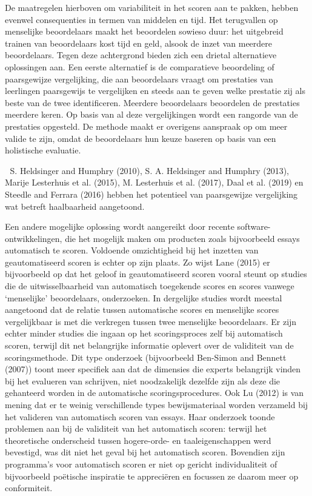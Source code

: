 \documentclass[
  letterpaper,
]{report}
\begin{document}
De maatregelen hierboven om variabiliteit in het scoren aan te pakken,
hebben evenwel consequenties in termen van middelen en tijd. Het
terugvallen op menselijke beoordelaars maakt het beoordelen sowieso
duur: het uitgebreid trainen van beoordelaars kost tijd en geld, alsook
de inzet van meerdere beoordelaars. Tegen deze achtergrond bieden zich
een drietal alternatieve oplossingen aan. Een eerste alternatief is de
comparatieve beoordeling of paarsgewijze vergelijking, die aan
beoordelaars vraagt om prestaties van leerlingen paarsgewijs te
vergelijken en steeds aan te geven welke prestatie zij als beste van de
twee identificeren. Meerdere beoordelaars beoordelen de prestaties
meerdere keren. Op basis van al deze vergelijkingen wordt een rangorde
van de prestaties opgesteld. De methode maakt er overigens aanspraak op
om meer valide te zijn, omdat de beoordelaars hun keuze baseren op basis
van een holistische evaluatie.

📖 S. Heldsinger and Humphry (2010), S. A. Heldsinger and Humphry
(2013), Marije Lesterhuis et al. (2015), M. Lesterhuis et al. (2017),
Daal et al. (2019) en Steedle and Ferrara (2016) hebben het potentieel
van paarsgewijze vergelijking wat betreft haalbaarheid aangetoond.

Een andere mogelijke oplossing wordt aangereikt door recente
software-ontwikkelingen, die het mogelijk maken om producten zoals
bijvoorbeeld essays automatisch te scoren. Voldoende omzichtigheid bij
het inzetten van geautomatiseerd scoren is echter op zijn plaats. Zo
wijst Lane (2015) er bijvoorbeeld op dat het geloof in geautomatiseerd
scoren vooral steunt op studies die de uitwisselbaarheid van automatisch
toegekende scores en scores vanwege `menselijke' beoordelaars,
onderzoeken. In dergelijke studies wordt meestal aangetoond dat de
relatie tussen automatische scores en menselijke scores vergelijkbaar is
met die verkregen tussen twee menselijke beoordelaars. Er zijn echter
minder studies die ingaan op het scoringsproces zelf bij automatisch
scoren, terwijl dit net belangrijke informatie oplevert over de
validiteit van de scoringsmethode. Dit type onderzoek (bijvoorbeeld
Ben-Simon and Bennett (2007)) toont meer specifiek aan dat de dimensies
die experts belangrijk vinden bij het evalueren van schrijven, niet
noodzakelijk dezelfde zijn als deze die gehanteerd worden in de
automatische scoringsprocedures. Ook Lu (2012) is van mening dat er te
weinig verschillende types bewijsmateriaal worden verzameld bij het
valideren van automatisch scoren van essays. Haar onderzoek toonde
problemen aan bij de validiteit van het automatisch scoren: terwijl het
theoretische onderscheid tussen hogere-orde- en taaleigenschappen werd
bevestigd, was dit niet het geval bij het automatisch scoren. Bovendien
zijn programma's voor automatisch scoren er niet op gericht
individualiteit of bijvoorbeeld poëtische inspiratie te appreciëren en
focussen ze daarom meer op conformiteit.
\end{document}
